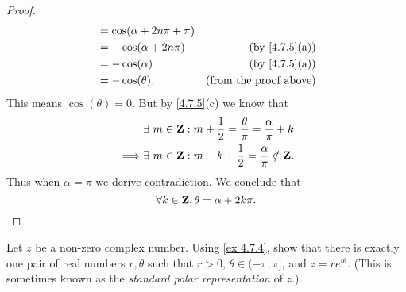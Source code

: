 \begin{proof}
\begin{align*}
                 & = \cos(\alpha + 2 n \pi + \pi)                                        \\
                 & = -\cos(\alpha + 2 n \pi)             & \text{(by \cref{4.7.5}(a))}   \\
                 & = -\cos(\alpha)                       & \text{(by \cref{4.7.5}(a))}   \\
                 & = -\cos(\theta).                      & \text{(from the proof above)}
  \end{align*}
  This means \(\cos(\theta) = 0\).
  But by \cref{4.7.5}(c) we know that
  \begin{align*}
             & \exists\ m \in \mathbf{Z} : m + \frac{1}{2} = \frac{\theta}{\pi} = \frac{\alpha}{\pi} + k \\
    \implies & \exists\ m \in \mathbf{Z} : m - k + \frac{1}{2} = \frac{\alpha}{\pi} \notin \mathbf{Z}.
  \end{align*}
  Thus when \(\alpha = \pi\) we derive contradiction.
  We conclude that
  \[
    \forall k \in \mathbf{Z}, \theta = \alpha + 2 k \pi.
  \]
\end{proof}

\begin{exercise}\label{ex 4.7.6}
  Let \(z\) be a non-zero complex number.
  Using \cref{ex 4.7.4}, show that there is exactly one pair of real numbers \(r, \theta\) such that \(r > 0\), \(\theta \in (-\pi, \pi]\), and \(z = r e^{i \theta}\).
  (This is sometimes known as the \emph{standard polar representation} of \(z\).)
\end{exercise}

